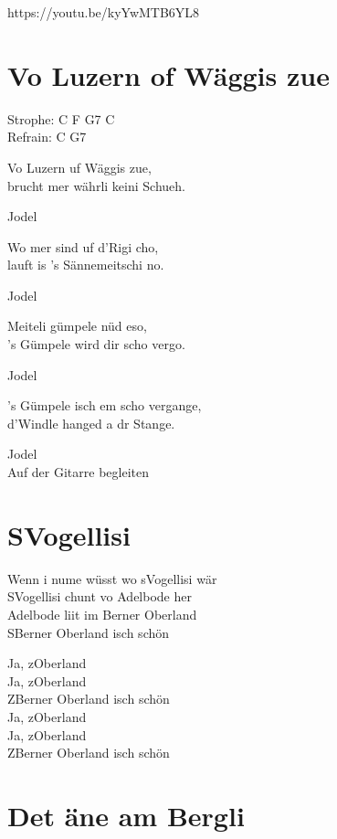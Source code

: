 \documentclass[
  letterpaper,
  a5paper]{memoir}
\begin{document}
https://youtu.be/kyYwMTB6YL8

\hypertarget{vo-luzern-of-wuxe4ggis-zue}{%
\chapter{Vo Luzern of Wäggis zue}\label{vo-luzern-of-wuxe4ggis-zue}}

Strophe: C F G7 C\\
Refrain: C G7

Vo Luzern uf Wäggis zue,\\
brucht mer währli keini Schueh.

Jodel

Wo mer sind uf d'Rigi cho,\\
lauft is 's Sännemeitschi no.

Jodel

Meiteli gümpele nüd eso,\\
's Gümpele wird dir scho vergo.

Jodel

's Gümpele isch em scho vergange,\\
d'Windle hanged a dr Stange.

Jodel\\
Auf der Gitarre begleiten

\hypertarget{svogellisi}{%
\chapter{S\textquotesingle Vogellisi}\label{svogellisi}}

Wenn i nume wüsst wo s\textquotesingle Vogellisi wär\\
S\textquotesingle Vogellisi chunt vo Adelbode her\\
Adelbode liit im Berner Oberland\\
S\textquotesingle Berner Oberland isch schön

Ja, z\textquotesingle Oberland\\
Ja, z\textquotesingle Oberland\\
Z\textquotesingle Berner Oberland isch schön\\
Ja, z\textquotesingle Oberland\\
Ja, z\textquotesingle Oberland\\
Z\textquotesingle Berner Oberland isch schön

\hypertarget{det-uxe4ne-am-bergli}{%
\chapter{Det äne am Bergli}\label{det-uxe4ne-am-bergli}}
\end{document}
